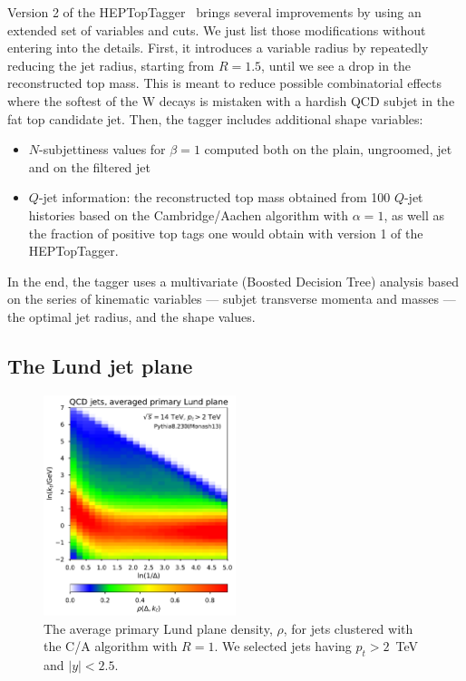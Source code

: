 Version 2 of the HEPTopTagger~\cite{Kasieczka:2015jma} brings several
improvements by using an extended set of variables and cuts. We just
list those modifications without entering into the details.
%
First, it introduces a variable radius by repeatedly reducing the jet
radius, starting from $R=1.5$, until we see a drop in the
reconstructed top mass. This is meant to reduce possible combinatorial
effects where the softest of the W decays is mistaken with a hardish
QCD subjet in the fat top candidate jet.
%
Then, the tagger includes additional shape variables:
\begin{itemize}
\item $N$-subjettiness values for $\beta=1$ computed both on the
  plain, ungroomed, jet and on the filtered jet
\item $Q$-jet information: the reconstructed top mass obtained from
  100 $Q$-jet histories based on the Cambridge/Aachen algorithm with $\alpha=1$,
  as well as the fraction of positive top tags one would obtain with
  version 1 of the HEPTopTagger.
\end{itemize}
% 
In the end, the tagger uses a multivariate (Boosted Decision Tree)
analysis based on the series of kinematic variables --- subjet
transverse momenta and masses --- the optimal jet radius, and the
shape values.

\subsection{The Lund jet plane}

\begin{figure}
  \centerline{\includegraphics[width=0.5\textwidth,page=1]{figures/plot-Wdiscrim-lund-images.pdf}}
  \caption{The average primary Lund plane density, $\rho$, for jets
    clustered with the C/A algorithm with $R=1$. We selected jets having
    $p_t>2$~TeV and $|y|<2.5$.}\label{fig:lund-primary-plane}
\end{figure}
  

